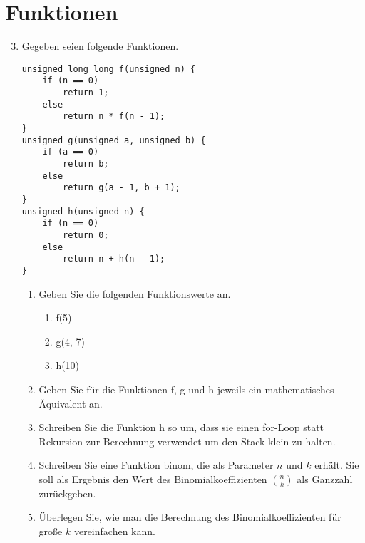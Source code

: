 \documentclass[ngerman]{tudscrreprt}
\begin{document}
\section*{Funktionen}
\begin{enumerate}
	\setcounter{enumi}{2}
	\item Gegeben seien folgende Funktionen.
	      \begin{lstlisting}[frame=single]
unsigned long long f(unsigned n) {
    if (n == 0)
        return 1;
    else
        return n * f(n - 1);
}
unsigned g(unsigned a, unsigned b) {
    if (a == 0)
        return b;
    else
        return g(a - 1, b + 1);
}
unsigned h(unsigned n) {
    if (n == 0)
        return 0;
    else
        return n + h(n - 1);
}
	\end{lstlisting}
	\begin{enumerate}
		\item Geben Sie die folgenden Funktionswerte an.
		      \begin{enumerate}[label=\roman*)]
		      	\item f(5)
		      	\item g(4, 7)
		      	\item h(10)
		      \end{enumerate}
		\item Geben Sie für die Funktionen f, g und h jeweils ein mathematisches Äquivalent an.
		\item Schreiben Sie die Funktion h so um, dass sie einen for-Loop statt Rekursion zur Berechnung verwendet um den Stack klein zu halten.
		\item Schreiben Sie eine Funktion binom, die als Parameter $n$ und $k$ erhält. Sie soll als Ergebnis den Wert des Binomialkoeffizienten $\binom{n}{k}$ als Ganzzahl zurückgeben.
		\item Überlegen Sie, wie man die Berechnung des Binomialkoeffizienten für große $k$ vereinfachen kann.
	\end{enumerate}
\end{enumerate}
\end{document}
